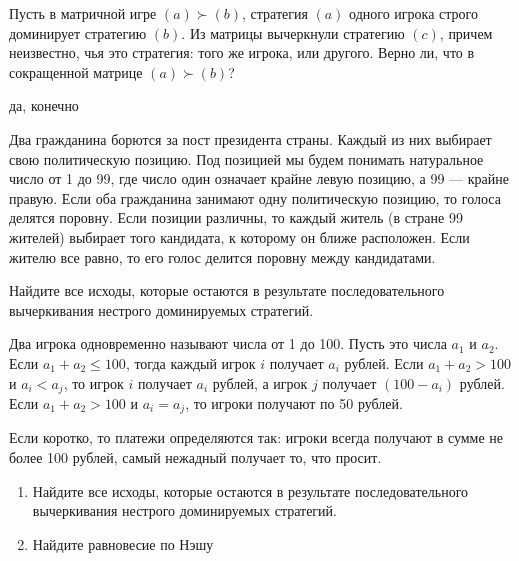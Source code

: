 \begin{problem}
Пусть в матричной игре  $\left(a\right)\succ \left(b\right)$, стратегия  $\left(a\right)$  одного игрока строго доминирует стратегию  $\left(b\right)$. Из матрицы вычеркнули стратегию  $\left(c\right)$, причем неизвестно, чья это стратегия: того же игрока, или другого. Верно ли, что в сокращенной матрице  $\left(a\right)\succ \left(b\right)$?




\begin{sol}
да, конечно
\end{sol}
\end{problem}




\begin{problem}[Президент]
Два гражданина борются за пост президента страны. Каждый из них выбирает свою политическую позицию. Под позицией мы будем понимать натуральное число от 1 до 99, где число один означает крайне левую позицию, а 99 --- крайне правую. Если оба гражданина занимают одну политическую позицию, то голоса делятся поровну. Если позиции различны, то каждый житель (в стране 99 жителей) выбирает того кандидата, к которому он ближе расположен. Если жителю все равно, то его голос делится поровну между кандидатами.\par
Найдите все исходы, которые остаются в результате последовательного вычеркивания нестрого доминируемых стратегий.



\begin{sol}

\end{sol}
\end{problem}

\begin{problem}
 Два игрока одновременно называют числа от 1 до 100. Пусть это числа  $a_{1} $  и  $a_{2} $. Если  $a_{1} +a_{2} \le 100$, тогда каждый игрок  $i$  получает  $a_{i} $  рублей. Если  $a_{1} +a_{2} >100$  и  $a_{i} <a_{j} $, то игрок  $i$  получает  $a_{i} $  рублей, а игрок  $j$  получает  $\left(100-a_{i} \right)$  рублей. Если  $a_{1} +a_{2} >100$  и  $a_{i} =a_{j} $, то игроки получают по 50 рублей. \par
Если коротко, то платежи определяются так: игроки всегда получают в сумме не более 100 рублей, самый нежадный получает то, что просит.
\begin{enumerate}
\item Найдите все исходы, которые остаются в результате последовательного вычеркивания нестрого доминируемых стратегий.

\item Найдите равновесие по Нэшу
\end{enumerate}


\begin{sol}

\end{sol}
\end{problem}


